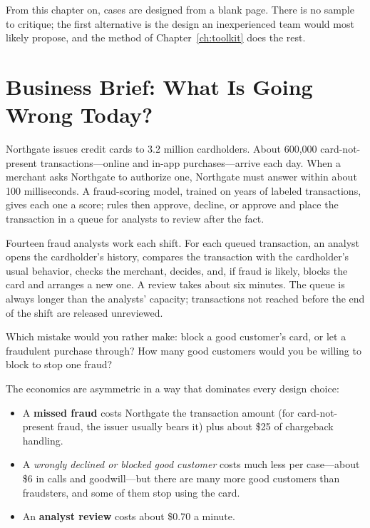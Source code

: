 From this chapter on, cases are designed from a blank page. There is no sample to critique; the first alternative is the design an inexperienced team would most likely propose, and the method of Chapter~\ref{ch:toolkit} does the rest.

\section{Business Brief: What Is Going Wrong Today?}
\label{sec:fr-brief}

Northgate issues credit cards to 3.2 million cardholders. About 600{,}000 card-not-present transactions---online and in-app purchases---arrive each day. When a merchant asks Northgate to authorize one, Northgate must answer within about 100 milliseconds. A fraud-scoring model, trained on years of labeled transactions, gives each one a score; rules then approve, decline, or approve and place the transaction in a queue for analysts to review after the fact.

Fourteen fraud analysts work each shift. For each queued transaction, an analyst opens the cardholder's history, compares the transaction with the cardholder's usual behavior, checks the merchant, decides, and, if fraud is likely, blocks the card and arranges a new one. A review takes about six minutes. The queue is always longer than the analysts' capacity; transactions not reached before the end of the shift are released unreviewed.

\begin{thinkabout}
Which mistake would you rather make: block a good customer's card, or let a fraudulent purchase through? How many good customers would you be willing to block to stop one fraud?
\end{thinkabout}

The economics are asymmetric in a way that dominates every design choice:
\begin{itemize}[itemsep=1pt]
  \item A \textbf{missed fraud} costs Northgate the transaction amount (for card-not-present fraud, the issuer usually bears it) plus about \$25 of chargeback handling.
  \item A \emph{wrongly declined or blocked good customer} costs much less per case---about \$6 in calls and goodwill---but there are many more good customers than fraudsters, and some of them stop using the card.
  \item An \textbf{analyst review} costs about \$0.70 a minute.
\end{itemize}

